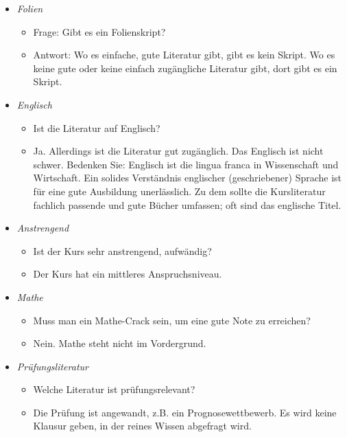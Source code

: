 \documentclass[
]{book}
\providecommand{\tightlist}{%
  \setlength{\itemsep}{0pt}\setlength{\parskip}{0pt}}
\begin{document}
\begin{itemize}
\tightlist
\item
  \emph{Folien}

  \begin{itemize}
  \tightlist
  \item
    Frage: Gibt es ein Folienskript?
  \item
    Antwort: Wo es einfache, gute Literatur gibt, gibt es kein Skript. Wo es keine gute oder keine einfach zugängliche Literatur gibt, dort gibt es ein Skript.
  \end{itemize}
\item
  \emph{Englisch}

  \begin{itemize}
  \tightlist
  \item
    Ist die Literatur auf Englisch?
  \item
    Ja. Allerdings ist die Literatur gut zugänglich. Das Englisch ist nicht schwer. Bedenken Sie: Englisch ist die lingua franca in Wissenschaft und Wirtschaft. Ein solides Verständnis englischer (geschriebener) Sprache ist für eine gute Ausbildung unerlässlich. Zu dem sollte die Kursliteratur fachlich passende und gute Bücher umfassen; oft sind das englische Titel.
  \end{itemize}
\item
  \emph{Anstrengend}

  \begin{itemize}
  \tightlist
  \item
    Ist der Kurs sehr anstrengend, aufwändig?
  \item
    Der Kurs hat ein mittleres Anspruchsniveau.
  \end{itemize}
\item
  \emph{Mathe}

  \begin{itemize}
  \tightlist
  \item
    Muss man ein Mathe-Crack sein, um eine gute Note zu erreichen?
  \item
    Nein. Mathe steht nicht im Vordergrund.
  \end{itemize}
\item
  \emph{Prüfungsliteratur}

  \begin{itemize}
  \tightlist
  \item
    Welche Literatur ist prüfungsrelevant?
  \item
    Die Prüfung ist angewandt, z.B. ein Prognosewettbewerb. Es wird keine Klausur geben, in der reines Wissen abgefragt wird.
  \end{itemize}
\end{itemize}
\end{document}
